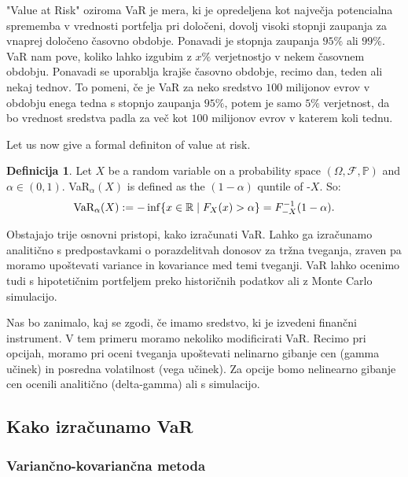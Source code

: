 \documentclass[a4paper, 12pt]{article}
\theoremstyle{definition}
\newtheorem{definicija}{Definicija}
\theoremstyle{plain}
\newcommand{\R}{\mathbb R}
\newcommand{\f}{\mathcal F}
\newcommand{\p}{\mathbb P}
\begin{document}
"Value at Risk" oziroma VaR je mera, ki je opredeljena kot največja potencialna sprememba v vrednosti portfelja pri določeni,
dovolj visoki stopnji zaupanja za vnaprej določeno časovno obdobje. Ponavadi je stopnja zaupanja $95\%$ ali $99\%$.
VaR nam pove, koliko lahko izgubim z $x\%$ verjetnostjo v nekem časovnem obdobju. Ponavadi se uporablja
krajše časovno obdobje, recimo dan, teden ali nekaj tednov.
To pomeni, če je VaR za neko sredstvo $100$ milijonov evrov v obdobju enega tedna s stopnjo zaupanja $95\%$,
potem je samo $5\%$ verjetnost, da bo vrednost sredstva padla za več kot $100$ milijonov evrov v katerem koli tednu.

Let us now give a formal definiton of value at risk. 
\begin{definicija}
Let $X$ be a random variable on a probability space $(\Omega, \f, \p)$ and $\alpha \in (0, 1)$.
VaR$_\alpha(X)$ is defined as the $(1-\alpha)$ quntile of -$X$. So:
$$
\textnormal{VaR}_\alpha(X) := - \inf \{ x \in \R \mid F_X(x) > \alpha \} = F^{-1}_{-X}(1-\alpha).
$$
\end{definicija}

Obstajajo trije osnovni pristopi, kako izračunati VaR. Lahko ga izračunamo analitično
s predpostavkami o porazdelitvah donosov za tržna tveganja, zraven pa moramo upoštevati variance
in kovariance med temi tveganji. VaR lahko ocenimo tudi s hipotetičnim portfeljem preko historičnih 
podatkov ali z Monte Carlo simulacijo. 

Nas bo zanimalo, kaj se zgodi, če imamo sredstvo, ki je izvedeni finančni instrument. V tem primeru moramo 
nekoliko modificirati VaR.
Recimo pri opcijah, moramo pri oceni tveganja upoštevati nelinarno gibanje cen (gamma učinek)
in posredna volatilnost (vega učinek). %
Za opcije bomo nelinearno gibanje cen ocenili analitično (delta-gamma) ali s simulacijo.


\subsection{Kako izračunamo VaR}

\subsubsection{Variančno-kovariančna metoda}
\end{document}
